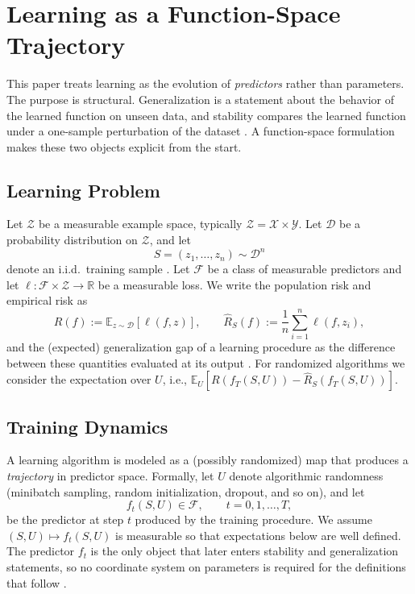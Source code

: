 \documentclass{article}
\numberwithin{equation}{section}
\begin{document}
\section{Learning as a Function-Space Trajectory}
\label{sec:function-trajectory}

This paper treats learning as the evolution of \emph{predictors} rather than parameters.
The purpose is structural.
Generalization is a statement about the behavior of the learned function on unseen data, and stability compares the learned function under a one-sample perturbation of the dataset \cite{bousquet2002stability}.
A function-space formulation makes these two objects explicit from the start.

\subsection{Learning Problem}
\label{subsec:learning-problem}

Let $\mathcal{Z}$ be a measurable example space, typically $\mathcal{Z}=\mathcal{X}\times\mathcal{Y}$.
Let $\mathcal{D}$ be a probability distribution on $\mathcal{Z}$, and let
\[
S=(z_1,\dots,z_n)\sim \mathcal{D}^n
\]
denote an i.i.d.\ training sample \cite{shalev2014understanding}.
Let $\mathcal{F}$ be a class of measurable predictors and let $\ell:\mathcal{F}\times\mathcal{Z}\to\mathbb{R}$ be a measurable loss.
We write the population risk and empirical risk as
\[
R(f) := \mathbb{E}_{z\sim\mathcal{D}}[\ell(f,z)],
\qquad
\widehat{R}_S(f) := \frac{1}{n}\sum_{i=1}^n \ell(f,z_i),
\]
and the (expected) generalization gap of a learning procedure as the difference between these quantities evaluated at its output \cite{shalev2014understanding}. For randomized algorithms we consider the expectation over $U$, i.e.,
$\mathbb{E}_U\!\left[R(f_T(S,U))-\widehat{R}_S(f_T(S,U))\right]$.


\subsection{Training Dynamics}
\label{subsec:training-dynamics}

A learning algorithm is modeled as a (possibly randomized) map that produces a \emph{trajectory} in predictor space.
Formally, let $U$ denote algorithmic randomness (minibatch sampling, random initialization, dropout, and so on), and let
\[
f_t(S,U)\in\mathcal{F},\qquad t=0,1,\dots,T,
\]
be the predictor at step $t$ produced by the training procedure. We assume $(S,U)\mapsto f_t(S,U)$ is measurable so that expectations below are well defined. The predictor $f_t$ is the only object that later enters stability and generalization statements, so no coordinate system on parameters is required for the definitions that follow \cite{bousquet2002stability}. 
\end{document}
